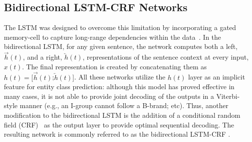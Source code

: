 


\subsection{Bidirectional LSTM-CRF Networks}

The LSTM was designed to overcome this limitation by incorporating a gated memory-cell to capture long-range dependencies within the data~\cite{hochreiter1997long}. In the bidirectional LSTM, for any given sentence, the network computes both a left, $\overrightarrow{h}(t)$, and a right, $\overleftarrow{ h}(t)$, representations of the sentence context at every input, $x(t)$. The final representation is created by concatenating them as $h(t) = [\overrightarrow{h}(t)$;$\overleftarrow{ h}(t)]$. All these networks utilize the $h(t)$ layer as an implicit feature for entity class prediction: although this model has proved effective in many cases, it is not able to provide joint decoding of the outputs in a Viterbi-style manner (e.g., an I-group cannot follow a B-brand; etc). Thus, another modification to the bidirectional LSTM is the addition of a conditional random field (CRF)~\cite{lafferty2001conditional} as the output layer to provide optimal sequential decoding. The resulting network is commonly referred to as the bidirectional LSTM-CRF \cite{lample2016neural}.



